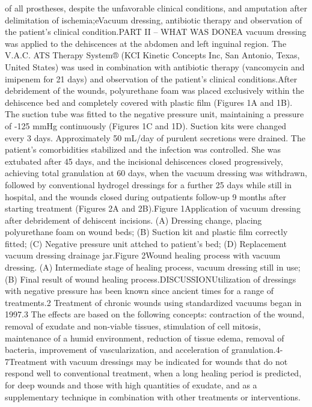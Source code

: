 \documentclass[numberinsection,times,10pt,spreadimages]{memoir}
\begin{document}
of all prostheses, despite the unfavorable clinical
conditions, and amputation after delimitation of ischemia;eVacuum dressing,
antibiotic therapy and observation of the patient’s
clinical condition.PART II – WHAT WAS DONEA vacuum dressing was applied to the
dehiscences at the abdomen and left inguinal
region. The V.A.C. ATS Therapy System® (KCI Kinetic Concepts Inc, San Antonio,
Texas, United States) was used in combination with antibiotic therapy
(vancomycin and imipenem for 21 days) and observation of the patient’s clinical
conditions.After debridement of the wounds, polyurethane foam was placed
exclusively within
the dehiscence bed and completely covered with plastic film (Figures 1A and 1B).
The suction tube was fitted to the negative
pressure unit, maintaining a pressure of -125 mmHg continuously (Figures 1C and
1D). Suction kits were changed every 3 days.
Approximately 50 mL/day of purulent secretions were drained. The patient’s
comorbidities stabilized and the infection was controlled. She was extubated
after 45 days, and the incisional dehiscences closed progressively, achieving
total granulation at 60 days, when the vacuum dressing was withdrawn, followed
by conventional hydrogel dressings for a further 25 days while still in
hospital, and the wounds closed during outpatients follow-up 9 months after
starting treatment (Figures 2A and
2B).Figure 1Application of vacuum dressing after debridement of dehiscent
incisions. (A) Dressing change, placing polyurethane foam on wound beds;
(B) Suction kit and plastic film correctly fitted; (C) Negative pressure
unit attched to patient’s bed; (D) Replacement vacuum dressing drainage
jar.Figure 2Wound healing process with vacuum dressing. (A) Intermediate stage
of
healing process, vacuum dressing still in use; (B) Final result of wound
healing process.DISCUSSIONUtilization of dressings with negative pressure has
been known since ancient
times for a range of treatments.2 Treatment of chronic wounds using standardized
vacuums
began in 1997.3 The effects
are based on the following concepts: contraction of the wound, removal of
exudate and non-viable tissues, stimulation of cell mitosis, maintenance of a
humid environment, reduction of tissue edema, removal of bacteria, improvement
of vascularization, and acceleration of granulation.4-7Treatment with vacuum
dressings may be indicated for wounds that do not respond
well to conventional treatment, when a long healing period is predicted, for
deep wounds and those with high quantities of exudate, and as a supplementary
technique in combination with other treatments or interventions.
\end{document}
